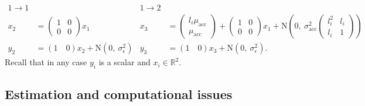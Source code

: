 \documentclass[12pt]{article}
\begin{document}
{\footnotesize
\begin{align*}
  1\rightarrow 1 && 1\rightarrow 2\\
  x_{2} &= 
  \begin{pmatrix}1&0\\0&0\end{pmatrix} x_{1} 
        &   x_{3}
                    &= \begin{pmatrix} l_i\mu_{\textrm{acc}}\\ \mu_{\textrm{acc}}\end{pmatrix} +
  \begin{pmatrix}1&0\\0&0\end{pmatrix} x_{1} +
                         \mbox{N}\left(0,\ \sigma_{\textrm{acc}}^2\begin{pmatrix} l_i^2 & l_i\\ l_i & 1 \end{pmatrix}\right)\\
  y_2 &= (1\quad  0)  x_2 + \mbox{N}(0,\
                                 \sigma_\epsilon^2) &
y_3 &= (1\quad  0) x_3 + \mbox{N}(0,\
                                 \sigma_\epsilon^2).
\end{align*}
}%
Recall that in any case $y_i$ is a scalar and $x_i \in \mathbb{R}^2$.


\subsection{Estimation and computational issues}
\label{sec:computational-issues}
\end{document}
